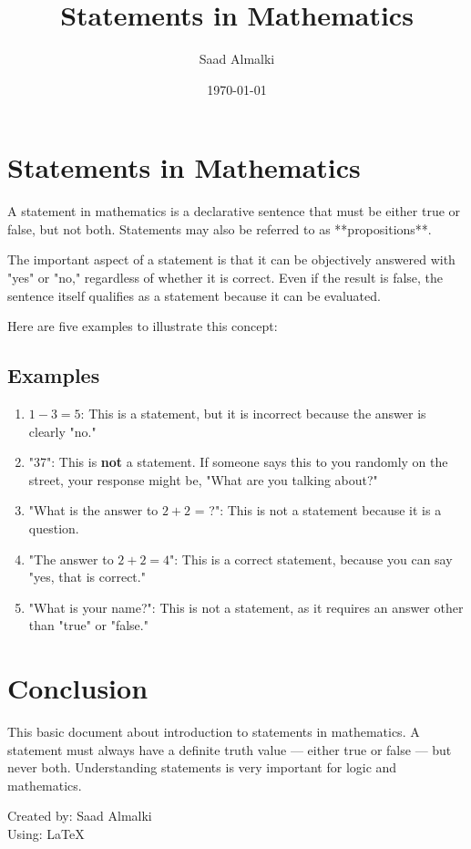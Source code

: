 \documentclass[12pt]{article}
\title{Statements in Mathematics}
\author{Saad Almalki}
\date{\today}
\begin{document}
\maketitle

\section{Statements in Mathematics}

A statement in mathematics is a declarative sentence that must be either true or false, but not both. Statements may also be referred to as **propositions**.

The important aspect of a statement is that it can be objectively answered with "yes" or "no," regardless of whether it is correct. Even if the result is false, the sentence itself qualifies as a statement because it can be evaluated.

Here are five examples to illustrate this concept:

\subsection{Examples}

\begin{enumerate}
    \item \(1 - 3 = 5\): This is a statement, but it is incorrect because the answer is clearly "no."
    \item "37": This is \textbf{not} a statement. If someone says this to you randomly on the street, your response might be, "What are you talking about?"
    \item "What is the answer to \(2 + 2\) = ?": This is not a statement because it is a question.
    \item "The answer to \(2 + 2 = 4\)": This is a correct statement, because you can say "yes, that is correct."
    \item "What is your name?": This is not a statement, as it requires an answer other than "true" or "false."
\end{enumerate}

\section{Conclusion}

This basic document about introduction to statements in mathematics. A statement must always have a definite truth value — either true or false — but never both. Understanding statements is very important for logic and mathematics.

\begin{flushright}
Created by: Saad Almalki \\
Using: \LaTeX
\end{flushright}
\end{document}
